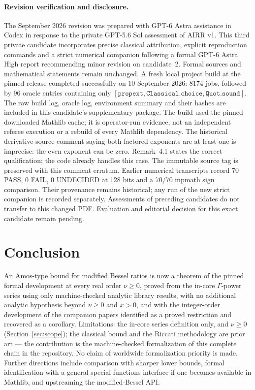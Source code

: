 \documentclass[11pt]{article}
\newcommand{\lean}[1]{\texttt{#1}}
\begin{document}
{\sloppy
\paragraph{Revision verification and disclosure.}
The September 2026 revision was prepared with GPT-6 Astra assistance
in Codex in response to the private GPT-5.6 Sol assessment of AIRR v1.
This third private candidate incorporates precise classical attribution,
explicit reproduction commands and a strict numerical companion following
a formal GPT-6 Astra High report recommending minor revision on candidate~2.
Formal sources and mathematical statements remain unchanged. A fresh local
project build at the pinned release completed successfully on 10 September
2026: 8174 jobs, followed by 96 oracle entries containing only
$[\lean{propext},\lean{Classical.choice},\lean{Quot.sound}]$.
The raw build log, oracle log, environment summary and their hashes are
included in this candidate's supplementary package. The build used the
pinned downloaded Mathlib cache; it is operator-run evidence, not an
independent referee execution or a rebuild of every Mathlib dependency.
The historical derivative-source comment saying both factored exponents
are at least one is imprecise: the even exponent can be zero. Remark~4.1
states the correct qualification; the code already handles this case.
The immutable source tag is preserved with this comment erratum.
Earlier numerical transcripts record 70 PASS, 0 FAIL, 0 UNDECIDED at
128 bits and a 70/70 mpmath sign comparison. Their provenance remains
historical; any run of the new strict companion is recorded separately.
Assessments of preceding candidates do not transfer to this changed PDF.
Evaluation and editorial decision for this exact candidate remain pending.\par}



\section{Conclusion}

An Amos-type bound for modified Bessel ratios is now a theorem of
the pinned formal development at every real order $\nu \ge 0$,
proved from the in-core $\Gamma$-power series using only
machine-checked analytic library results, with no additional
analytic hypothesis beyond $\nu \ge 0$ and $x > 0$, and with
the integer-order development of the companion papers identified as
a proved restriction and recovered as a corollary.  Limitations:
the in-core series definition only, and $\nu \ge 0$
(Section~\ref{sec:scope}); the classical bound and the Riccati
methodology are prior art --- the contribution is the machine-checked
formalization of this complete chain in the repository. No claim of
worldwide formalization priority is made. Further directions include
comparison with sharper lower bounds, formal identification with a
general special-functions interface if one becomes available in Mathlib,
and upstreaming the modified-Bessel API.
\end{document}
